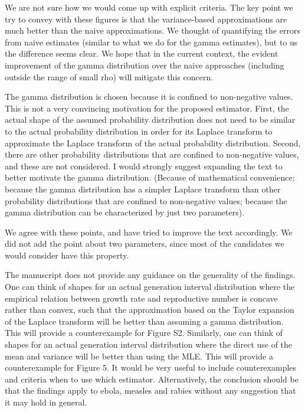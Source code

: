 \documentclass[12pt]{article}
\newcommand{\revtext}{\textsf}
\begin{document}
We are not sure how we would come up with explicit criteria. The key point we try to convey with these figures is that the variance-based approximations are much better than the naive approximations. We thought of quantifying the errors from naive estimates (similar to what we do for the gamma estimates), but to us the difference seems clear. We hope that in the current context, the evident improvement of the gamma distribution over the naive approaches (including outside the range of small rho) will mitigate this concern.

\revtext{The gamma distribution is chosen because it is confined to non-negative values. This is not a very convincing motivation for the proposed estimator. First, the actual shape of the assumed probability distribution does not need to be similar to the actual probability distribution in order for its Laplace transform to approximate the Laplace transform of the actual probability distribution. Second, there are other probability distributions that are confined to non-negative values, and these are not considered. I would strongly suggest expanding the text to better motivate the gamma distribution. (Because of mathematical convenience; because the gamma distribution has a simpler Laplace transform than other probability distributions that are confined to non-negative values; because the gamma distribution can be characterized by just two parameters).}

We agree with these points, and have tried to improve the text accordingly. We did not add the point about two parameters, since most of the candidates we would consider have this property.

\revtext{The manuscript does not provide any guidance on the generality of the findings. One can think of shapes for an actual generation interval distribution where the empirical relation between growth rate and reproductive number is concave rather than convex, such that the approximation based on the Taylor expansion of the Laplace transform will be better than assuming a gamma distribution. This will provide a counterexample for Figure S2. Similarly, one can think of shapes for an actual generation interval distribution where the direct use of the mean and variance will be better than using the MLE. This will provide a counterexample for Figure 5. It would be very useful to include counterexamples and criteria when to use which estimator. Alternatively, the conclusion should be that the findings apply to ebola, measles and rabies without any suggestion that it may hold in general.}
\end{document}
